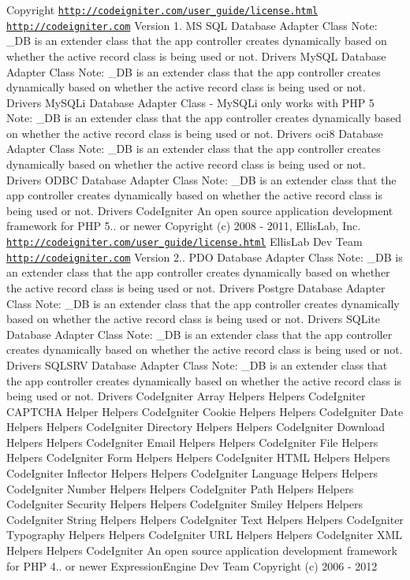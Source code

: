 \begin{DoxyCopyright}{Copyright}
\href{http://codeigniter.com/user_guide/license.html}{\tt http\-://codeigniter.\-com/user\-\_\-guide/license.\-html}  \href{http://codeigniter.com}{\tt http\-://codeigniter.\-com}  Version 1.  M\-S S\-Q\-L Database Adapter Class Note\-: \-\_\-\-D\-B is an extender class that the app controller creates dynamically based on whether the active record class is being used or not.  Drivers My\-S\-Q\-L Database Adapter Class Note\-: \-\_\-\-D\-B is an extender class that the app controller creates dynamically based on whether the active record class is being used or not.  Drivers My\-S\-Q\-Li Database Adapter Class -\/ My\-S\-Q\-Li only works with P\-H\-P 5 Note\-: \-\_\-\-D\-B is an extender class that the app controller creates dynamically based on whether the active record class is being used or not.  Drivers oci8 Database Adapter Class Note\-: \-\_\-\-D\-B is an extender class that the app controller creates dynamically based on whether the active record class is being used or not.  Drivers O\-D\-B\-C Database Adapter Class Note\-: \-\_\-\-D\-B is an extender class that the app controller creates dynamically based on whether the active record class is being used or not.  Drivers Code\-Igniter An open source application development framework for P\-H\-P 5.. or newer  Copyright (c) 2008 -\/ 2011, Ellis\-Lab, Inc.  \href{http://codeigniter.com/user_guide/license.html}{\tt http\-://codeigniter.\-com/user\-\_\-guide/license.\-html}  Ellis\-Lab Dev Team  \href{http://codeigniter.com}{\tt http\-://codeigniter.\-com}  Version 2..  P\-D\-O Database Adapter Class Note\-: \-\_\-\-D\-B is an extender class that the app controller creates dynamically based on whether the active record class is being used or not.  Drivers Postgre Database Adapter Class Note\-: \-\_\-\-D\-B is an extender class that the app controller creates dynamically based on whether the active record class is being used or not.  Drivers S\-Q\-Lite Database Adapter Class Note\-: \-\_\-\-D\-B is an extender class that the app controller creates dynamically based on whether the active record class is being used or not.  Drivers S\-Q\-L\-S\-R\-V Database Adapter Class Note\-: \-\_\-\-D\-B is an extender class that the app controller creates dynamically based on whether the active record class is being used or not.  Drivers Code\-Igniter Array Helpers  Helpers Code\-Igniter C\-A\-P\-T\-C\-H\-A Helper  Helpers Code\-Igniter Cookie Helpers  Helpers Code\-Igniter Date Helpers  Helpers Code\-Igniter Directory Helpers  Helpers Code\-Igniter Download Helpers  Helpers Code\-Igniter Email Helpers  Helpers Code\-Igniter File Helpers  Helpers Code\-Igniter Form Helpers  Helpers Code\-Igniter H\-T\-M\-L Helpers  Helpers Code\-Igniter Inflector Helpers  Helpers Code\-Igniter Language Helpers  Helpers Code\-Igniter Number Helpers  Helpers Code\-Igniter Path Helpers  Helpers Code\-Igniter Security Helpers  Helpers Code\-Igniter Smiley Helpers  Helpers Code\-Igniter String Helpers  Helpers Code\-Igniter Text Helpers  Helpers Code\-Igniter Typography Helpers  Helpers Code\-Igniter U\-R\-L Helpers  Helpers Code\-Igniter X\-M\-L Helpers  Helpers Code\-Igniter An open source application development framework for P\-H\-P 4.. or newer  Expression\-Engine Dev Team  Copyright (c) 2006 -\/ 2012 
\end{DoxyCopyright}
